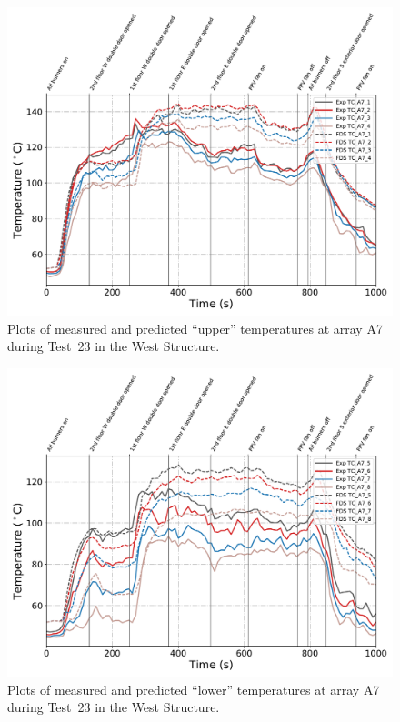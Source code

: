 \begin{figure}[!h]
	\centering
	\includegraphics[width=\columnwidth]{Figures/Plots/Validation/Temperature/Test_23_TC_A7_upper}
	\caption{Plots of measured and predicted ``upper'' temperatures at array A7 during Test~23 in the West Structure.}
	\label{fig:TCA7_upper_data_Test23}
\end{figure}
\begin{figure}[!h]
	\centering
	\includegraphics[width=\columnwidth]{Figures/Plots/Validation/Temperature/Test_23_TC_A7_lower}
	\caption{Plots of measured and predicted ``lower'' temperatures at array A7 during Test~23 in the West Structure.}
	\label{fig:TCA7_lower_data_Test23}
\end{figure}

